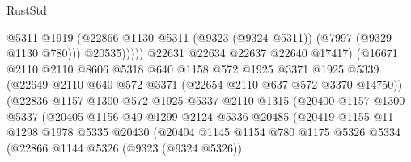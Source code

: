 \begin{lexlean}{RustStd}
\begin{coremodule}
                                      @5311
                                      @1919
                                      (@22866
                                        @1130
                                        @5311
                                        (@9323 (@9324 @5311))
                                        (@7997 (@9329 @1130 @780)))
                                      @20535)))))
                            @22631
                            @22634
                            @22637
                            @22640
                            @17417)
                          (@16671
                            @2110
                            @2110
                            @8606
                            @5318
                            @640
                            @1158
                            @572
                            @1925
                            @3371
                            @1925
                            @5339
                            (@22649 @2110 @640 @572 @3371 (@22654 @2110 @637 @572 @3370 @14750))
                            (@22836
                              @1157
                              @1300
                              @572
                              @1925
                              @5337
                              @2110
                              @1315
                              (@20400
                                @1157
                                @1300
                                @5337
                                (@20405
                                  @1156
                                  @49
                                  @1299
                                  @2124
                                  @5336
                                  @20485
                                  (@20419
                                    @1155
                                    @11
                                    @1298
                                    @1978
                                    @5335
                                    @20430
                                    (@20404
                                      @1145
                                      @1154
                                      @780
                                      @1175
                                      @5326
                                      @5334
                                      (@22866
                                        @1144
                                        @5326
                                        (@9323 (@9324 @5326))

\end{coremodule}
\end{lexlean}
